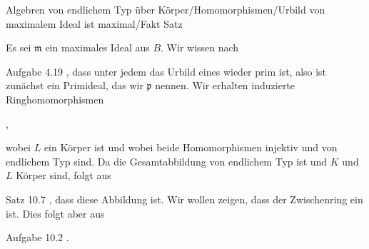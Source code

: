 {Algebren von endlichem Typ über Körper/Homomorphismen/Urbild von maximalem Ideal ist maximal/Fakt}
{Satz}
{}
{



\faktsituation {}
\faktzusatz {}
\faktzusatz {}





}
{





Es sei ${\mathfrak m}$ ein maximales Ideal aus $B$. Wir wissen nach

Aufgabe 4.19
,
dass unter jedem
das Urbild eines
wieder prim ist, also ist
 zunächst ein Primideal, das wir ${\mathfrak p}$ nennen. Wir erhalten induzierte Ringhomomorphismen

 { , }

wobei $L$ ein Körper ist und wobei beide Homomorphismen injektiv und von endlichem Typ sind. Da die Gesamtabbildung von endlichem Typ ist und $K$ und $L$ Körper sind, folgt aus

Satz 10.7
,
dass diese Abbildung
ist. Wir wollen zeigen, dass der Zwischenring
 ein
ist. Dies folgt aber aus

Aufgabe 10.2
.




}






